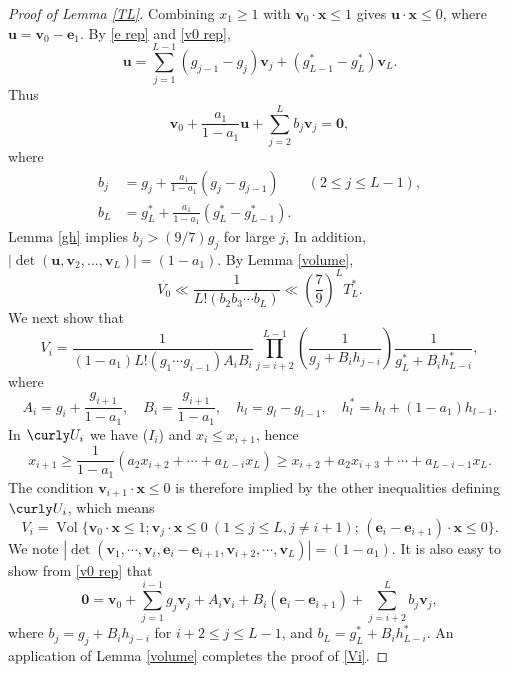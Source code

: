 \documentclass[11pt]{amsart}
\theoremstyle{remark}
\theoremstyle{plain}
\numberwithin{equation}{section}
\newcommand{\be}{\begin{equation}}
\newcommand{\ee}{\end{equation}}
\renewcommand{\(}{\left(}
\renewcommand{\)}{\right)}
\newcommand{\pfrac}[2]{\left(\frac{#1}{#2}\right)}
\newcommand{\fancyU}{\curly U}
\renewcommand{\le}{\leqslant}
\renewcommand{\ge}{\geqslant}
\newcommand{\vx}{\mathbf{x}}
\DeclareMathOperator{\vvol}{Vol}
\newcommand{\vv}{\mathbf{v}}
\newcommand{\vu}{\mathbf{u}}
\newcommand{\vz}{\mathbf{0}}
\newcommand{\ve}{\mathbf{e}}
\begin{document}
\begin{proof}[Proof of Lemma \ref{TL}]
Combining $x_1\ge 1$ with $\vv_0 \cdot \vx \le 1$
gives $\vu \cdot \vx \le 0$, where
$\vu = \vv_0 - \ve_1.$  By
\eqref{e rep} and \eqref{v0 rep},
$$
\vu = \sum_{j=1}^{L-1} (g_{j-1}-g_j) \vv_j + (g_{L-1}^*-g_L^*)\vv_L.
$$
Thus
$$
\vv_0 + \frac{a_1}{1-a_1} \vu + \sum_{j=2}^L b_j \vv_j = \vz,
$$
where
\begin{align*}
b_j &= g_j + \frac{a_1}{1-a_1}(g_j- g_{j-1}) \qquad (2\le j \le L-1), \\
b_L &= g_L^* + \frac{a_1}{1-a_1}(g_L^*-g_{L-1}^*).
\end{align*}
Lemma \ref{gh} implies $b_j > (9/7)g_j$ for large $j$,
In addition, $|\det(\vu, \vv_2, \ldots, \vv_L)| = (1-a_1)$.
By Lemma \ref{volume},
\be\label{V0}
V_0 \ll \frac{1}{L! (b_2 b_3 \cdots b_L)} \ll \pfrac{7}{9}^L T_L^*.
\ee
We next show that
\be\label{Vi}
V_i = \frac{1}{(1-a_1) L! (g_1 \cdots g_{i-1})A_iB_i} \prod_{j=i+2}^{L-1}
\pfrac{1}{g_j+B_ih_{j-i}} \frac{1}{g_L^* + B_i h_{L-i}^*},
\ee
where
$$
A_i = g_i + \frac{g_{i+1}}{1-a_1}, \quad B_i=\frac{g_{i+1}}{1-a_1}, \quad
h_l=g_l-g_{l-1}, \quad h_l^*=h_l+(1-a_1)h_{l-1}.
$$
In $\fancyU_i$ we have ($I_i$) and $x_i \le x_{i+1}$, hence
\[
x_{i+1} \ge \frac{1}{1-a_1} (a_2 x_{i+2} + \cdots + a_{L-i} x_L) 
\ge x_{i+2} + a_2 x_{i+3} + \cdots + a_{L-i-1} x_L.
\]
The condition $\vv_{i+1} \cdot \vx \le 0$ is therefore
implied by the other
inequalities defining $\fancyU_i$, which means
$$
V_i = \vvol\{\vv_0 \cdot \vx \le 1; \vv_j \cdot \vx \le 0\ (1\le
 j\le L, j\ne i+1);\, (\ve_i-\ve_{i+1}) \cdot \vx \le 0 \}.
$$
We note $|\det(\vv_1, \cdots, \vv_i, \ve_i-\ve_{i+1}, 
\vv_{i+2}, \cdots, \vv_L)|=
(1-a_1)$.  It is also easy to show from \eqref{v0 rep} that
$$
\vz = \vv_0 + \sum_{j=1}^{i-1} g_j \vv_j + A_i\vv_i + B_i(\ve_i-\ve_{i+1}) +
\sum_{j=i+2}^L b_j \vv_j,
$$
where $b_j = g_j + B_i h_{j-i}$ for $i+2 \le j \le L-1$, and  $b_L=g_L^*+B_i
h_{L-i}^*.$
An application of Lemma \ref{volume} completes the proof of \eqref{Vi}.


\end{proof}
\end{document}
